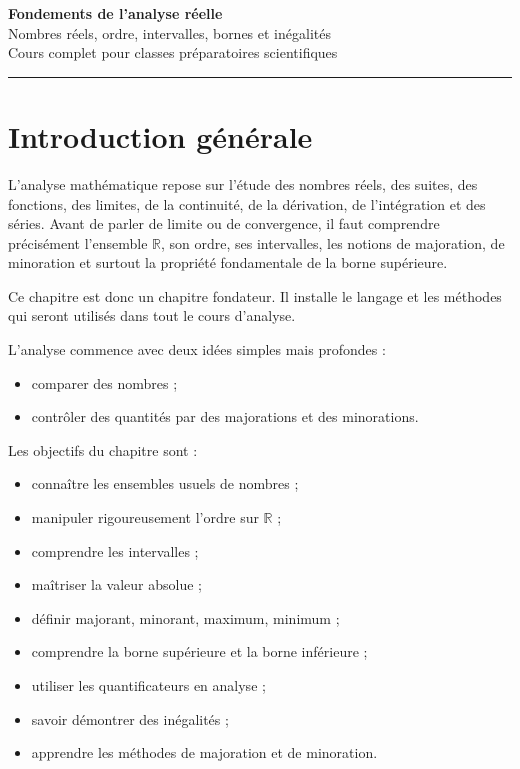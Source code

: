 \documentclass[11pt,a4paper]{article}
\newcommand{\R}{\mathbb R}
\begin{document}
\begin{center}
    {\Huge \textbf{Fondements de l'analyse réelle}}\\[2mm]
    {\Large Nombres réels, ordre, intervalles, bornes et inégalités}\\[2mm]
    {\large Cours complet pour classes préparatoires scientifiques}\\[2mm]
    \rule{0.88\linewidth}{0.5pt}
\end{center}

\vspace{0.4cm}

\tableofcontents

\newpage

\section*{Introduction générale}

L'analyse mathématique repose sur l'étude des nombres réels, des suites, des fonctions, des limites, de la continuité, de la dérivation, de l'intégration et des séries.  
Avant de parler de limite ou de convergence, il faut comprendre précisément l'ensemble \(\R\), son ordre, ses intervalles, les notions de majoration, de minoration et surtout la propriété fondamentale de la borne supérieure.

Ce chapitre est donc un chapitre fondateur. Il installe le langage et les méthodes qui seront utilisés dans tout le cours d'analyse.

\begin{retenirbox}
L'analyse commence avec deux idées simples mais profondes :
\begin{itemize}
    \item comparer des nombres ;
    \item contrôler des quantités par des majorations et des minorations.
\end{itemize}
\end{retenirbox}

Les objectifs du chapitre sont :
\begin{itemize}
    \item connaître les ensembles usuels de nombres ;
    \item manipuler rigoureusement l'ordre sur \(\R\) ;
    \item comprendre les intervalles ;
    \item maîtriser la valeur absolue ;
    \item définir majorant, minorant, maximum, minimum ;
    \item comprendre la borne supérieure et la borne inférieure ;
    \item utiliser les quantificateurs en analyse ;
    \item savoir démontrer des inégalités ;
    \item apprendre les méthodes de majoration et de minoration.
\end{itemize}
\end{document}
